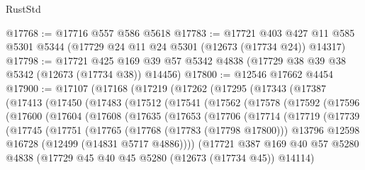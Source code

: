 \begin{lexlean}{RustStd}
\begin{coremodule}
@17768 := @17716 @557 @586 @5618
@17783 := @17721
    @403
    @427
    @11
    @585
    @5301
    @5344
    (@17729 @24 @11 @24 @5301 (@12673 (@17734 @24)) @14317)
@17798 := @17721
    @425
    @169
    @39
    @57
    @5342
    @4838
    (@17729 @38 @39 @38 @5342 (@12673 (@17734 @38)) @14456)
@17800 := @12546 @17662 @4454
@17900 := @17107
    (@17168
      (@17219
        (@17262
          (@17295
            (@17343
              (@17387
                (@17413
                  (@17450
                    (@17483
                      (@17512
                        (@17541
                          (@17562
                            (@17578
                              (@17592
                                (@17596
                                  (@17600
                                    (@17604
                                      (@17608
                                        (@17635
                                          (@17653
                                            (@17706
                                              (@17714
                                                (@17719
                                                  (@17739
                                                    (@17745
                                                      (@17751
                                                        (@17765
                                                          (@17768 (@17783 (@17798 @17800)))
                                                          @13796
                                                          @12598
                                                          @16728
                                                          (@12499 (@14831 @5717 @4886))))
                                                      (@17721
                                                        @387
                                                        @169
                                                        @40
                                                        @57
                                                        @5280
                                                        @4838
                                                        (@17729
                                                          @45
                                                          @40
                                                          @45
                                                          @5280
                                                          (@12673 (@17734 @45))
                                                          @14114)

\end{coremodule}
\end{lexlean}
